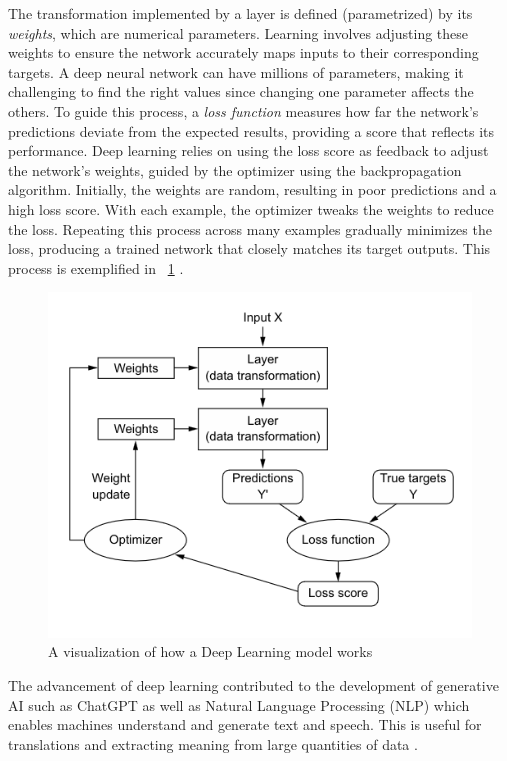 \documentclass[licencjacka,en]{pracamgr}
\begin{document}
The transformation implemented by a layer is defined (parametrized) by its \textit{weights}, which are numerical parameters. Learning involves adjusting these weights to ensure the network accurately maps inputs to their corresponding targets. A deep neural network can have millions of parameters, making it challenging to find the right values since changing one parameter affects the others. To guide this process, a \textit{loss function} measures how far the network's predictions deviate from the expected results, providing a score that reflects its performance. Deep learning relies on using the loss score as feedback to adjust the network's weights, guided by the optimizer using the backpropagation algorithm. Initially, the weights are random, resulting in poor predictions and a high loss score. With each example, the optimizer tweaks the weights to reduce the loss. Repeating this process across many examples gradually minimizes the loss, producing a trained network that closely matches its target outputs. This process is exemplified in ~\ref{fig:nn_function} \cite{francuz}.

\begin{figure}
    \centering
    \includegraphics[width=0.5\linewidth]{bachelor_images/nn_function.png}
    \caption{A visualization of how a Deep Learning model works \cite{francuz}}
    \label{fig:nn_function}
\end{figure}

The advancement of deep learning contributed to the development of generative AI such as ChatGPT as well as Natural Language Processing (NLP) which enables machines understand and generate text and speech. This is useful for translations and extracting meaning from large quantities of data \cite{ibm_dl}.

\end{document}

